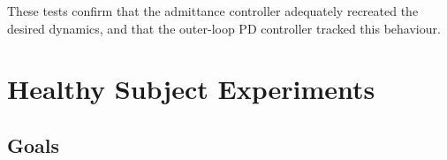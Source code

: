 \documentclass[12pt]{report}
\begin{document}
	

	
		
	These tests confirm that the admittance controller adequately recreated the desired dynamics, and that the outer-loop PD controller tracked this behaviour. 
	
	
	
	
	\section{Healthy Subject Experiments}
	
		\subsection{Goals}
	
\end{document}
